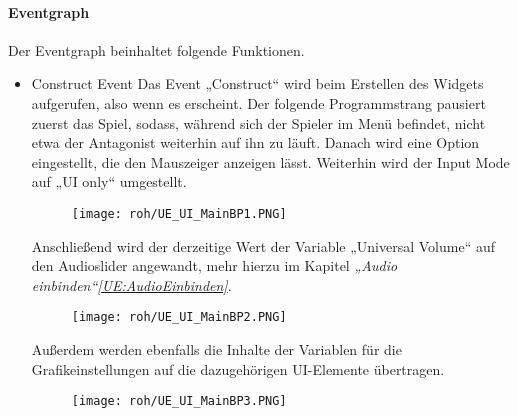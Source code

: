 \paragraph{Eventgraph}
Der Eventgraph beinhaltet folgende Funktionen.
\begin{itemize}
    \item Construct Event
    Das Event „Construct“ wird beim Erstellen des Widgets aufgerufen, also wenn es erscheint. Der folgende Programmstrang pausiert zuerst das Spiel, sodass, während sich der Spieler im Menü befindet, nicht etwa der Antagonist weiterhin auf ihn zu läuft. Danach wird eine Option eingestellt, die den Mauszeiger anzeigen lässt. Weiterhin wird der Input Mode auf „UI only“ umgestellt.
    \begin{figure}[H]
        \centering
        \texttt{[image: roh/UE\_UI\_MainBP1.PNG]}
        \label{UE:UI_MainBP1}
    \end{figure}
    Anschließend wird der derzeitige Wert der Variable „Universal Volume“ auf den Audioslider angewandt, mehr hierzu im Kapitel \textit{„Audio einbinden“\ref{UE:AudioEinbinden}}.
    \begin{figure}[H]
        \centering
        \texttt{[image: roh/UE\_UI\_MainBP2.PNG]}
        \label{UE:UI_MainBP2}
    \end{figure}
    Außerdem werden ebenfalls die Inhalte der Variablen für die Grafikeinstellungen auf die dazugehörigen UI-Elemente übertragen.
    \begin{figure}[H]
        \centering
        \texttt{[image: roh/UE\_UI\_MainBP3.PNG]}
        \label{UE:UI_MainBP3_4_1}
    \end{figure}


\end{itemize}
